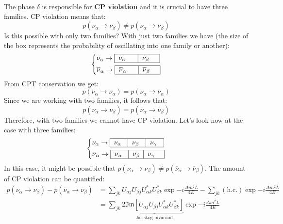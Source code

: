 \documentclass[10.75pt,a4paper,openright,bottom=2cm]{article}
\begin{document}
The phase $\delta$ is responsible for \textbf{CP violation} and it is crucial to have three families. CP violation means that:
\[
p(\nu_\alpha\to\nu_\beta)\neq p(\overline{\nu}_\alpha\to\overline{\nu}_\beta)
\]
Is this possible with only two families? With just two families we have (the size of the box represents the probability of oscillating into one family or another):
\[
\left\{
\begin{aligned}
&\nu_\alpha\to\begin{tabular}{|p{0.8cm}|p{0.7cm}|}
\hline
    $\nu_\alpha$ & $\nu_\beta$ \\
    \hline
\end{tabular}\\
&\overline{\nu}_\alpha\to\begin{tabular}{|p{0.8cm}|p{0.7cm}|}
\hline
    $\overline{\nu}_\alpha$ & $\overline{\nu}_\beta$ \\
    \hline
\end{tabular}
\end{aligned}
\right.
\]
From CPT conservation we get:
\[
p(\nu_\alpha\to\nu_\alpha)=p(\overline{\nu}_\alpha\to\overline{\nu}_\alpha)
\]
Since we are working with two families, it follows that:
\[
p(\nu_\alpha\to\nu_\beta)=p(\overline{\nu}_\alpha\to\overline{\nu}_\beta)
\]
Therefore, with two families we cannot have CP violation. Let's look now at the case with three families:
\[
\left\{
\begin{aligned}
&\nu_\alpha\to\begin{tabular}{|p{0.5cm}|p{0.5cm}|p{0.5cm}|}
\hline
    $\nu_\alpha$ & $\nu_\beta$ & $\nu_\gamma$\\
    \hline
\end{tabular}\\
&\overline{\nu}_\alpha\to\begin{tabular}{|p{0.5cm}|p{0.35cm}|p{0.65cm}|}
\hline
    $\overline{\nu}_\alpha$ & $\overline{\nu}_\beta$ & $\overline{\nu}_\gamma$ \\
    \hline
\end{tabular}
\end{aligned}
\right.
\]
In this case, it might be possible that $p(\nu_\alpha\to\nu_\beta)\neq p(\overline{\nu}_\alpha\to\overline{\nu}_\beta)$. The amount of CP violation can be quantified:
\begin{align*}
p(\nu_\alpha\to\nu_\beta)-p(\overline{\nu}_\alpha\to\overline{\nu}_\beta)&=\sum_{jk}U_{\alpha j}U_{\beta j}U_{\alpha k}^*U_{\beta k}^*\exp{-i\frac{\Delta m^2L}{4E}}-\sum_{jk}(\text{h.c.})\exp{-i\frac{\Delta m^2L}{4E}}\\
&=\sum_{jk}2\underbrace{\mathfrak{Im}[U_{\alpha j}U_{\beta j}U_{\alpha k}^*U_{\beta k}^*]}_{\text{Jarlskog invariant}}\exp{-i\frac{\Delta m^2L}{4E}}
\end{align*}
\end{document}
